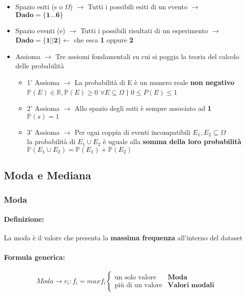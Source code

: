 \documentclass[]{article}
\newcommand{\definizione}{\paragraph{Definizione:}}
\newcommand{\formula}{\paragraph{Formula generica:}}
\begin{document}
\begin{itemize}
        \item Spazio esiti (s o $\Omega$) $\rightarrow$ Tutti i possibili esiti di un evento $\rightarrow$ $\boldsymbol{Dado=\{1 \ldots 6\}}$
        \item Spazio eventi (e) $\rightarrow$ Tutti i possibili risultati di un esperimento $\rightarrow$ $\boldsymbol{Dado=\{1||2\}} \leftarrow$ che esca \textbf{1} oppure \textbf{2}
        \item Assioma $\rightarrow$ Tre assiomi fondamentali su cui si poggia la teoria del calcolo delle probabilità
        \begin{itemize}
            \item 1' Assioma $\rightarrow$ La probabilità di E è un numero reale \textbf{non negativo} $\mathbb{P}(E) \in \mathbb{R}, \mathbb{P}(E) \geq 0$ $ \forall E \subseteq \Omega $ \space \textbf{|} \space $0 \leq P(E) \leq 1$
            \item 2' Assioma $\rightarrow$ Allo spazio degli esiti è sempre associato ad \textbf{1} \\ $\mathbb{P}(s) = 1$
            \item 3' Assioma $\rightarrow$ Per ogni coppia di eventi incompatibili $E_1, E_2 \subseteq \Omega$ \\ la probabilità di $E_1 \cup E_2$ è uguale alla \textbf{somma della loro probabilità} \\ $\mathbb{P}(E_1 \cup E_2) = \mathbb{P}(E_1) + \mathbb{P}(E_2)$
        \end{itemize} 
    \end{itemize}
    \newpage 

    \subsection{Moda e Mediana}
    \subsubsection{Moda}
    \definizione La moda è il valore che presenta la \textbf{massima frequenza} all'interno del dataset
    \formula
    \begin{equation*}
        Moda \rightarrow v_i : f_i = max f_i
        \begin{cases}
            \text{un solo valore} & \textbf{Moda} \\
            \text{più di un valore} & \textbf{Valori modali}
        \end{cases}
    \end{equation*}
\end{document}
